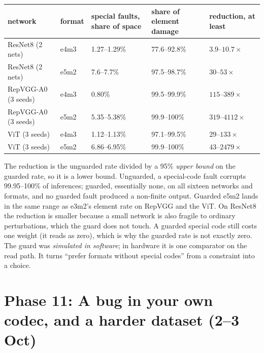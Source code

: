 \begin{center}
\small
\begin{tabular}{@{}llp{2.9cm}p{2.9cm}p{2.6cm}@{}}
\toprule
network & format & special faults, share of space & share of element damage & reduction, at least \\
\midrule
ResNet8 (2 nets) & e4m3 & 1.27--1.29\% & 77.6--92.8\% & $3.9$--$10.7\times$ \\
ResNet8 (2 nets) & e5m2 & 7.6--7.7\% & 97.5--98.7\% & $30$--$53\times$ \\
RepVGG-A0 (3 seeds) & e4m3 & 0.80\% & 99.5--99.9\% & $115$--$389\times$ \\
RepVGG-A0 (3 seeds) & e5m2 & 5.35--5.38\% & 99.9--100\% & $319$--$4112\times$ \\
ViT (3 seeds) & e4m3 & 1.12--1.13\% & 97.1--99.5\% & $29$--$133\times$ \\
ViT (3 seeds) & e5m2 & 6.86--6.95\% & 99.9--100\% & $43$--$2479\times$ \\
\bottomrule
\end{tabular}
\end{center}
The reduction is the unguarded rate divided by a 95\% \emph{upper bound} on the guarded rate, so it is a lower bound. Unguarded, a special-code fault corrupts 99.95--100\% of inferences; guarded, essentially none, on all sixteen networks and formats, and no guarded fault produced a non-finite output.
Guarded e5m2 lands in the same range as e3m2's element rate on RepVGG and the ViT. On ResNet8 the reduction is smaller because a small network is also fragile to ordinary perturbations, which the guard does not touch. A guarded special code still costs one weight (it reads as zero), which is why the guarded rate is not exactly zero.
The guard was \emph{simulated in software}; in hardware it is one comparator on the read path. It turns ``prefer formats without special codes'' from a constraint into a choice.

\section{Phase 11: A bug in your own codec, and a harder dataset (2--3 Oct)}
\label{sec:phase-c100}

